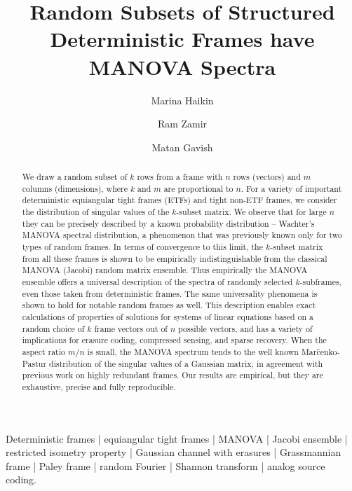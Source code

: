 \documentclass[a4paper,12pt]{article}
\begin{document}
\title{Random Subsets of Structured Deterministic Frames have MANOVA Spectra}


\author{
    Marina Haikin \footnotemark[1]
    \and 
    Ram Zamir \footnotemark[1]
    \and
    Matan Gavish \footnotemark[2]
}

\date{}
\maketitle

\renewcommand{\thefootnote}{\fnsymbol{footnote}}
\renewcommand{\thefootnote}{\arabic{footnote}}

\begin{abstract}
%   
We draw a random subset of $k$ rows from a frame with $n$ rows (vectors) and $m$
columns (dimensions), where $k$ and $m$ are proportional to $n$.  For a variety
of important deterministic equiangular tight frames (ETFs) and tight non-ETF
frames, we consider the distribution of singular values of the $k$-subset
matrix.  We observe that for large $n$ they can be precisely described by a
known probability distribution -- Wachter's MANOVA spectral distribution, a
phenomenon that was previously known only for two types of random frames.  In
terms of convergence to this limit, the $k$-subset matrix from all these frames
is shown to be empirically indistinguishable from the classical MANOVA (Jacobi) random matrix
ensemble.  
Thus empirically the MANOVA ensemble offers a universal description
of the spectra of randomly selected
$k$-subframes, even those taken from deterministic frames. The same
universality phenomena is
shown to hold for notable random frames as well.
This description enables exact calculations of properties of solutions for
systems of linear equations based on a random choice of $k$ frame vectors out of
$n$ possible vectors, and has a variety of implications for erasure coding,
compressed sensing, and sparse recovery.  
When the aspect ratio $m/n$ is small, the MANOVA spectrum tends to the well
known Mar\u cenko-Pastur distribution of the singular values of a Gaussian
matrix, in agreement with previous work on highly redundant frames.
Our results are empirical, but they
are exhaustive, precise and fully reproducible.
%
\end{abstract}

{\small
{}
Deterministic frames | 
equiangular tight frames |
MANOVA |
Jacobi ensemble |
restricted isometry property |
Gaussian channel with erasures |
Grassmannian frame |
Paley frame |
random Fourier |
Shannon transform |
analog source coding.
}
~\\
\end{document}
